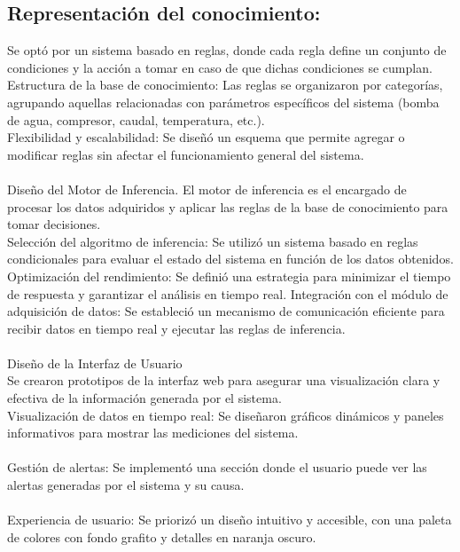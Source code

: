    \subsection{Representación del conocimiento: }
Se optó por un sistema basado en reglas, donde cada regla define un conjunto de condiciones y la acción a tomar en caso de que dichas condiciones se cumplan. \\
Estructura de la base de conocimiento: Las reglas se organizaron por categorías, agrupando aquellas relacionadas con parámetros específicos del sistema (bomba de agua, compresor, caudal, temperatura, etc.).\\
Flexibilidad y escalabilidad: Se diseñó un esquema que permite agregar o modificar reglas sin afectar el funcionamiento general del sistema. \\
\\
Diseño del Motor de Inferencia. 
El motor de inferencia es el encargado de procesar los datos adquiridos y aplicar las reglas de la base de conocimiento para tomar decisiones. \\
Selección del algoritmo de inferencia: Se utilizó un sistema basado en reglas condicionales para evaluar el estado del sistema en función de los datos obtenidos. \\
Optimización del rendimiento: Se definió una estrategia para minimizar el tiempo de respuesta y garantizar el análisis en tiempo real.
Integración con el módulo de adquisición de datos: Se estableció un mecanismo de comunicación eficiente para recibir datos en tiempo real y ejecutar las reglas de inferencia. \\
\\
Diseño de la Interfaz de Usuario\\
Se crearon prototipos de la interfaz web para asegurar una visualización clara y efectiva de la información generada por el sistema. \\
Visualización de datos en tiempo real: Se diseñaron gráficos dinámicos y paneles informativos para mostrar las mediciones del sistema. \\
\\
Gestión de alertas: Se implementó una sección donde el usuario puede ver las alertas generadas por el sistema y su causa. \\
\\

Experiencia de usuario: Se priorizó un diseño intuitivo y accesible, con una paleta de colores con fondo grafito y detalles en naranja oscuro. \\

